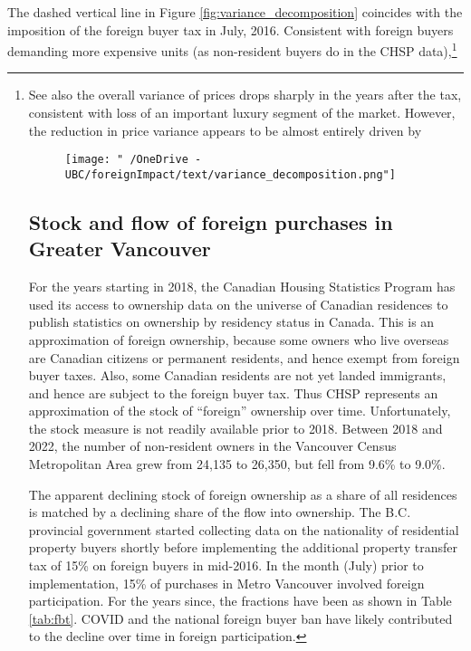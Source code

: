 \documentclass[12pt]{article}
\begin{document}
The dashed vertical line in Figure \ref{fig:variance_decomposition} coincides
with the imposition of the foreign buyer tax in July, 2016. Consistent with
foreign buyers demanding more expensive units (as non-resident buyers do in the
CHSP data),\footnote{See also  the overall variance of prices drops sharply in the years after the
tax, consistent with loss of an important luxury segment of the market.
However, the reduction in price variance appears to be almost entirely driven
by

\begin{figure}
\texttt{[image: "~/OneDrive - UBC/foreignImpact/text/variance\_decomposition.png"]}
\end{figure}


\section{Stock and flow of foreign purchases in Greater Vancouver}

For the years starting in 2018, the Canadian Housing Statistics Program has used its access to ownership data on the universe of Canadian residences to publish statistics on ownership by residency status in Canada. This is an approximation of foreign ownership, because some owners who live overseas are Canadian citizens or permanent residents, and hence exempt from foreign buyer taxes. Also, some Canadian residents are not yet landed immigrants, and hence are subject to the foreign buyer tax. Thus CHSP represents an approximation of the stock of ``foreign'' ownership over time. Unfortunately, the stock measure is not readily available prior to 2018. Between 2018 and 2022, the number of non-resident owners in the Vancouver Census Metropolitan Area grew from 24,135 to 26,350, but fell from 9.6\% to 9.0\%.

The apparent declining stock of foreign ownership as a share of all residences
is matched by a declining share of the flow into ownership. The B.C. provincial
government started collecting data on the nationality of residential property
buyers shortly before implementing the additional property transfer tax of 15\%
on foreign buyers in mid-2016. In the month (July) prior to implementation,
15\% of purchases in Metro Vancouver involved foreign participation. For the
years since, the fractions have been as shown in Table \ref{tab:fbt}. COVID and
the national foreign buyer ban have likely contributed to the decline over time
in foreign participation.

}
\end{document}
